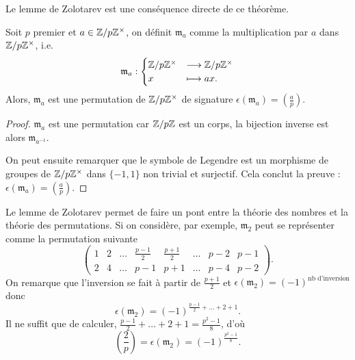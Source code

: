 \documentclass[../main.tex]{subfiles}
\begin{document}
Le lemme de Zolotarev est une conséquence directe de ce théorème.
\begin{theorem} Soit \(p\) premier et \(a\in \mathbb{Z}/p\mathbb{Z}^\times\), on définit \(\mathfrak{m}_a\) comme la multiplication par \(a\) dans \(\mathbb{Z}/p\mathbb{Z}^\times\), i.e.
    \begin{equation}
        \mathfrak{m}_a : \begin{cases}
            \mathbb{Z}/p\mathbb{Z}^\times & \longrightarrow \mathbb{Z}/p\mathbb{Z}^\times\\
            x & \longmapsto ax.
        \end{cases}
    \end{equation}
    Alors, \(\mathfrak{m}_a\) est une permutation de \(\mathbb{Z}/p\mathbb{Z}^\times\) de signature \(\epsilon(\mathfrak{m}_a) = \left(\frac{a}{p}\right)\).
\end{theorem}
\begin{proof} \(\mathfrak{m}_a\) est une permutation car \(\mathbb{Z}/p\mathbb{Z}\) est un corps, la bijection inverse est alors \(\mathfrak{m}_{a^{-1}}\).

    On peut ensuite remarquer que le symbole de Legendre est un morphisme de groupes de \(\mathbb{Z}/p\mathbb{Z}^\times\) dans \(\{-1,1\}\) non trivial et surjectif.
    Cela conclut la preuve : \(\epsilon(\mathfrak{m}_a) = \left(\frac{a}{p}\right)\).
\end{proof}
Le lemme de Zolotarev permet de faire un pont entre la théorie des nombres et la théorie des permutations.
Si on considère, par exemple, \(\mathfrak{m}_2\) peut se représenter comme la permutation suivante
\begin{equation}
    \begin{pmatrix}
        1 & 2 &  \ldots & \frac{p-1}{2} & \frac{p+1}{2}  & \ldots & p-2 & p-1\\
        2 & 4 &  \ldots & p-1 & p+1 & \ldots & p-4 & p-2
    \end{pmatrix}.
\end{equation}
On remarque que l'inversion se fait à partir de \(\frac{p+1}{2}\) et \(\epsilon(\mathfrak{m}_2) = (-1)^{\text{nb d'inversion}}\) donc
\begin{equation}
    \epsilon(\mathfrak{m}_2) = (-1)^{\frac{p-1}{2}+\ldots + 2 + 1}.
\end{equation}
Il ne suffit que de calculer, \(\frac{p-1}{2}+\ldots + 2 + 1 = \frac{p^2-1}{8}\), d'où
\begin{equation}
    \left(\frac{2}{p}\right) = \epsilon(\mathfrak{m}_2) = (-1)^{\frac{p^2-1}{8}}.
\end{equation}
\end{document}
